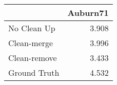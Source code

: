 \begin{tabular}{lr}
\toprule
{} & Auburn71 \\
\midrule
No Clean Up  &    3.908 \\
Clean-merge  &    3.996 \\
Clean-remove &    3.433 \\
Ground Truth &    4.532 \\
\bottomrule
\end{tabular}
